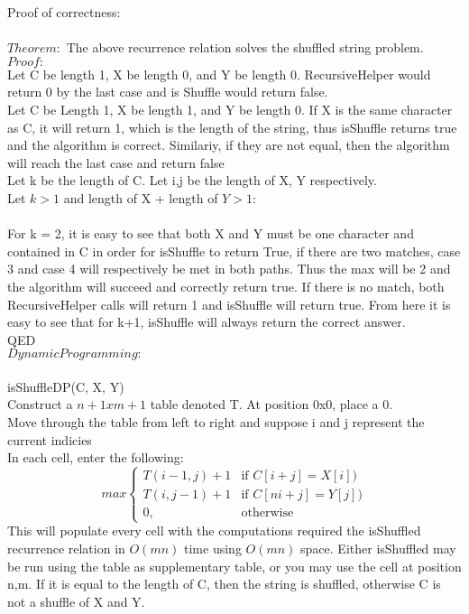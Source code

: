 \documentclass{article}
\begin{document}
\begin{enumerate}
Proof of correctness:\\
\\
$Theorem:$ The above recurrence relation solves the shuffled string problem. \\
$Proof:$ \\
Let C be length 1, X be length 0, and Y be length 0. RecursiveHelper would return 0 by the last case and is Shuffle would return false. \\
Let C be Length 1, X be length 1, and Y be length 0. If X is the same character as C, it will return 1, which is the length of the string, thus isShuffle returns true and the algorithm is correct. Similariy, if they are not equal, then the algorithm will reach the last case and return false\\
Let k be the length of C. Let i,j be the length of X, Y respectively. \\
Let $k > 1$ and length of X + length of $Y > 1$: \\
\\
For k = 2, it is easy to see that both X and Y must be one character and contained in C in order for isShuffle to return True, if there are two matches, case 3 and case 4 will respectively be met in both paths. Thus the max will be 2 and the algorithm will succeed and correctly return true. If there is no match, both RecursiveHelper calls will return 1 and isShuffle will return true. From here it is easy to see that for k+1, isShuffle will always return the correct answer.
\\
QED\\

$Dynamic Programming:$\\
\\
isShuffleDP(C, X, Y)\\

Construct a $n+1 x m+1$ table denoted T. At position 0x0, place a 0. \\
Move through the table from left to right and suppose i and j represent the current indicies\\
In each cell, enter the following: \\
    \[
     max
    \begin{cases}
        T(i - 1, j) + 1  & \text{if } C[i+j] = X[i])\\
        T(i, j - 1) + 1  & \text{if } C[ni+j] = Y[j])\\
        0, & \text{otherwise}
    \end{cases}
    \]
This will populate every cell with the computations required the isShuffled recurrence relation in $O(mn)$ time using $O(mn)$ space. Either isShuffled may be run using the table as supplementary table, or you may use the cell at position n,m. If it is equal to the length of C, then the string is shuffled, otherwise C is not a shuffle of X and Y.



\end{enumerate}
\end{document}
